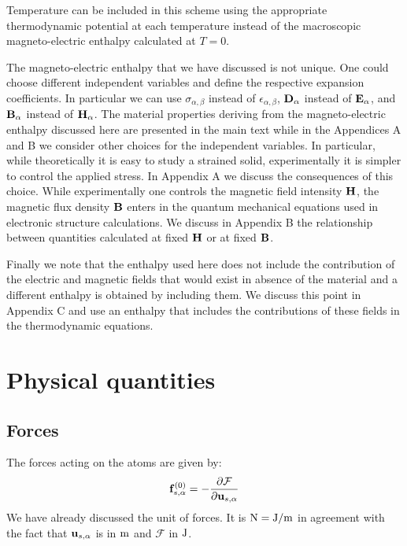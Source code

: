 \documentclass[12pt,a4paper,twoside]{report}
\begin{document}
Temperature can be included in this scheme using the appropriate
thermodynamic potential at each temperature instead of the macroscopic
magneto-electric enthalpy calculated at $T=0$. 

The magneto-electric enthalpy that we have discussed is not unique. One could 
choose different independent 
variables and define the respective expansion coefficients. In particular 
we can use $\sigma_{\alpha,\beta}$ instead of $\epsilon_{\alpha,\beta}$, 
${\bf D}_\alpha$ instead of ${\bf E}_\alpha$, and ${\bf B}_\alpha$ instead of
${\bf H}_\alpha$. 
The material properties deriving from the magneto-electric
enthalpy discussed here are presented in the
main text while in the Appendices A and B we consider  
other choices for the independent variables.
In particular, while theoretically it is easy to study a strained solid,
experimentally it is simpler to control the applied stress. In Appendix A 
we discuss the consequences of this choice. 
While experimentally one controls the magnetic field intensity
${\bf H}$, the magnetic flux density ${\bf B}$ enters in the quantum
mechanical equations used in electronic structure calculations. 
We discuss in Appendix B the relationship between quantities 
calculated at fixed ${\bf H}$ or at fixed ${\bf B}$. 

Finally we note that the enthalpy used here does not include the contribution 
of the electric and magnetic fields that would exist in absence of the 
material and a different enthalpy is obtained by including them. 
We discuss this point in Appendix C and use an enthalpy that includes
the contributions of these fields in the thermodynamic equations.

\newpage

{\color{dark-blue}\chapter{Physical quantities}}
\color{black}

{\color{coral}\section{Forces}}
\color{black}

The forces acting on the atoms are given by:
\begin{equation}
{\bf f}^{(0)}_{s,\alpha}=-{\partial \mathcal{F} \over \partial {\bf u}_{s,\alpha}}
\label{force}
\end{equation}
We have already discussed the unit of forces. It is ${\rm N}={\rm J}/{\rm m}$ in agreement
with the fact that ${\bf u}_{s,\alpha}$ is in ${\rm m}$ and $\mathcal{F}$ in ${\rm J}$.
\\
\end{document}

